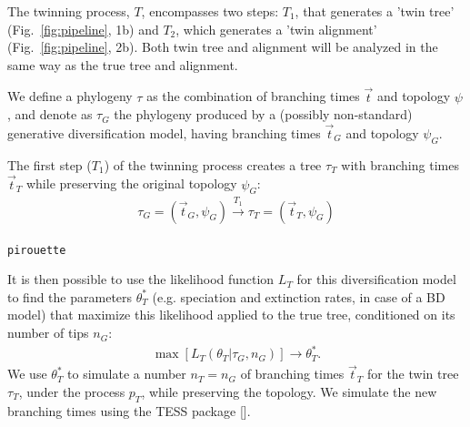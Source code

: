 The twinning process, $T$, encompasses two steps:
$T_1$, that generates a 'twin tree' (Fig.~\ref{fig:pipeline}, 1b) 
and $T_2$, which generates a 'twin alignment' (Fig.~\ref{fig:pipeline}, 2b).
Both twin tree and alignment will be analyzed in the same way as the true tree and alignment.

We define a phylogeny $\tau$ as the combination of
branching times $\Vec{t}$ and topology $\psi$, 
and denote as $\tau_{\mathit{G}}$ the phylogeny 
produced by a (possibly non-standard) generative diversification model, 
having branching times $\Vec{t}_{\mathit{G}}$ and 
topology $\psi_{\mathit{G}}$.

The first step ($T_1$) of the twinning process creates a tree $\tau_{\mathit{T}}$
with branching times $\Vec{t}_{\mathit{T}}$ while preserving the original
topology $\psi_{\mathit{G}}$:
\begin{align}
  \tau_{\mathit{G}} = (\Vec{t}_{\mathit{G}}, \psi_{\mathit{G}}) 
  \xrightarrow[]{\mathit{T_1}} 
  \tau_{\mathit{T}} = (\Vec{t}_{\mathit{T}}, \psi_{\mathit{G}})
\end{align}

\verb;pirouette;

It is then possible to use the likelihood function 
$L_{\mathit{T}}$ for this diversification model to find 
the parameters $\theta^{*}_{\mathit{T}}$ 
(e.g. speciation and extinction rates, in case of a BD model) 
that maximize this likelihood applied to the true tree, conditioned on its number of tips $n_{\mathit{G}}$:
\begin{align}
    \max[L_{\mathit{T}}(\theta_{\mathit{T}}|\tau_{\mathit{G}}, n_{\mathit{G}})] 
\rightarrow \theta^{*}_{\mathit{T}}.
\end{align}
We use $\theta^{*}_{\mathit{T}}$ to simulate a number 
$n_{\mathit{T}} = n_{\mathit{G}}$ 
of branching times $\Vec{t}_{\mathit{T}}$ for the twin tree 
$\tau_{\mathit{T}}$, under the process $p_{T}$, 
while preserving the topology. 
We simulate the new branching times using the TESS 
package [\cite{TESS}].

